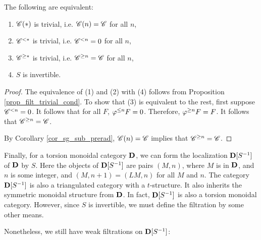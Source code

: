 \begin{cor}
The following are equivalent:
\begin{enumerate}
\item $\SGFilt{*}{\Cat{C}}$ is trivial, i.e. $\SGFilt{n}{\Cat{C}} = 
\Cat{C}$ for all $n$,

\item $\Corad{*}{\Cat{C}}$ is trivial, i.e. $\Corad{n}{\Cat{C}} = 0$ 
for all $n$,

\item $\Prerad{*}{\Cat{C}}$ is trivial, i.e. $\Prerad{n}{\Cat{C}} = 
\Cat{C}$ for all $n$,

\item $S$ is invertible.
\end{enumerate}
\end{cor}
\begin{proof}
The equivalence of (1) and (2) with (4) follows from Proposition
\ref{prop_filt_trivial_cond}. To show that (3) is equivalent to
the rest, first suppose $\Corad{n}{\Cat{C}} = 0$. It follows that 
for all $F$, $\corad{n}F = 0$. Therefore, $\prerad{n}F = F$. It 
follows that $\Prerad{n}{\Cat{C}} = \Cat{C}$.

By Corollary \ref{cor_sg_sub_prerad}, $\SGFilt{n}{\Cat{C}} = \Cat{C}$ implies
that $\Prerad{n}{\Cat{C}} = \Cat{C}$.
\end{proof}

Finally, for a torsion monoidal category $\DCat$, we can form the
localization $\DCatLoc{S}$ of $\DCat$ by $S$. Here the objects of
$\DCatLoc{S}$ are pairs $(M, n)$, where $M$ is in $\DCat$, and $n$
is some integer, and $(M, n + 1) = (LM, n)$ for all $M$ and $n$.
The category $\DCatLoc{S}$ is also a triangulated category with a
$t$-structure. It also inherits the symmetric monoidal structure
from $\DCat$. In fact, $\DCatLoc{S}$ is also a torsion monoidal 
category. However, since $S$ is invertible, we must define the
filtration by some other means.

Nonetheless, we still have weak filtrations on $\DCatLoc{S}$:

